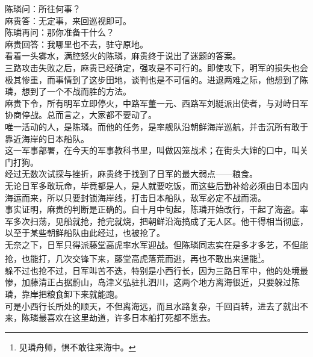 \begin{multicols}{\theparacolNo}
陈璘问：所往何事？\\

麻贵答：无定事，来回巡视即可。\\

陈璘再问：那你准备干什么？\\

麻贵回答：我哪里也不去，驻守原地。\\

看着一头雾水，满腔怒火的陈璘，麻贵终于说出了迷题的答案。\\

三路攻击失败之后，麻贵已经确定，强攻是不可行的。即使攻下，明军的损失也会极其惨重，而事情到了这步田地，谈判也是不可信的。进退两难之际，他想到了陈璘，想到了一个不战而胜的方法。\\

麻贵下令，所有明军立即停火，中路军董一元、西路军刘綎派出使者，与对峙日军协商停战。总而言之，大家都不要动了。\\

唯一活动的人，是陈璘。而他的任务，是率舰队沿朝鲜海岸巡航，并击沉所有敢于靠近海岸的日本船队。\\

这一军事部署，在今天的军事教科书里，叫做囚笼战术；在街头大婶的口中，叫关门打狗。\\

经过无数次试探与挫折，麻贵终于找到了日军的最大弱点——粮食。\\

无论日军多敢玩命，毕竟都是人，是人就要吃饭，而这些后勤补给必须由日本国内海运而来，所以只要封锁海岸线，打击日本船队，敌军必定不战而溃。\\

事实证明，麻贵的判断是正确的。自十月中旬起，陈璘开始改行，干起了海盗。率军多次扫荡，见船就抢，抢完就烧，把朝鲜沿海搞成了无人区。他干得相当彻底，以至于某些朝鲜船队由此经过，也被抢了。\\

无奈之下，日军只得派藤堂高虎率水军迎战。但陈璘同志实在是多才多艺，不但能抢，也能打，几次交锋下来，藤堂高虎落荒而逃，再也不敢出来逞能\footnote{见璘舟师，惧不敢往来海中。}。\\

躲不过也抢不过，日军叫苦不迭，特别是小西行长，因为三路日军中，他的处境最惨，加藤清正占据蔚山，岛津义弘驻扎泗川，这两个地方离海很近，只要躲过陈璘，靠岸把粮食卸下来就能跑。\\

可是小西行长所处的顺天，不但离海远，而且水路复杂，千回百转，进去了就出不来，陈璘最喜欢在这里劫道，许多日本船打死都不愿去。\\


\end{multicols}

